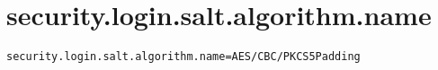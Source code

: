 \section{security.login.salt.algorithm.name}
\label{configuration:SecurityLoginSaltAlgorithmName}
\AvailableInJavaOnly{\TODO}
\begin{lstlisting}[style=Props,caption={Usage example for \textit{security.login.salt.algorithm.name}}]
security.login.salt.algorithm.name=AES/CBC/PKCS5Padding
\end{lstlisting}